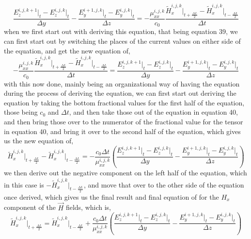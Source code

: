 \documentclass[]{article}
\begin{document}
\begin{equation}
\frac{E_{z}^{i, j, k+1} \Big|_t - E_{z}^{i,j,k}\Big|_t}{\Delta{y}} - \frac{E_{y}^{i+1, j, k} \Big|_t - E_{y}^{i,j,k}\Big|_t}{\Delta{z}} = -\frac{\mu_{xx}^{i,j,k}}{c_0} \frac{\tilde{H}_{x}^{i,j,k}\Big|_{t+\frac{\Delta{L}}{2}} - \tilde{H}_{x}^{i,j,k}\Big|_{t - \frac{\Delta{L}}{2}}}{\Delta{t}}
\end{equation}
when we first start out with deriving this equation, that being equation 39, we can first start out by switching the places of the current values on either side of the equation, and get the new equation of,
\\
\begin{equation}
-\frac{\mu_{xx}^{i,j,k}}{c_0} \frac{\tilde{H}_{x}^{i,j,k}\Big|_{t+\frac{\Delta{L}}{2}} - \tilde{H}_{x}^{i,j,k}\Big|_{t - \frac{\Delta{L}}{2}}}{\Delta{t}} = \frac{E_{z}^{i, j, k+1} \Big|_t - E_{z}^{i,j,k}\Big|_t}{\Delta{y}} - \frac{E_{y}^{i+1, j, k} \Big|_t - E_{y}^{i,j,k}\Big|_t}{\Delta{z}}
\end{equation}
with this now done, mainly being an organizational way of having the equation during the process of deriving the equation, we can first start out deriving the equation by taking the bottom fractional values for the first half of the equation, those being $c_0$ and $\Delta{t}$, and then take those out of the equation in equation 40, and then bring those over to the numerator of the fractional value for the tensor in equation 40, and bring it over to the second half of the equation, which gives us the new equation of,
\begin{equation}
\tilde{H}_{x}^{i,j,k}\Big|_{t+\frac{\Delta{L}}{2}} - \tilde{H}_{x}^{i,j,k}\Big|_{t - \frac{\Delta{L}}{2}} = -\frac{c_0\Delta{t}}{\mu_{xx}^{i,j,k}} \left(\frac{E_{z}^{i, j, k+1} \Big|_t - E_{z}^{i,j,k}\Big|_t}{\Delta{y}} - \frac{E_{y}^{i+1, j, k} \Big|_t - E_{y}^{i,j,k}\Big|_t}{\Delta{z}}\right)
\end{equation}
we then derive out the negative component on the left half of the equation, which in this case is $-\tilde{H}_{x}^{i,j,k}\Big|_{t - \frac{\Delta{L}}{2}}$, and move that over to the other side of the equation once derived, which gives us the final result and final equation of for the $H_x$ component of the $\vec{H}$ fields, which is,
\begin{equation}
\tilde{H}_{x}^{i,j,k}\Big|_{t+\frac{\Delta{L}}{2}} = \tilde{H}_{x}^{i,j,k}\Big|_{t - \frac{\Delta{L}}{2}} + \frac{c_0\Delta{t}}{\mu_{xx}^{i,j,k}} \left(\frac{E_{z}^{i, j, k+1} \Big|_t - E_{z}^{i,j,k}\Big|_t}{\Delta{y}} - \frac{E_{y}^{i+1, j, k} \Big|_t - E_{y}^{i,j,k}\Big|_t}{\Delta{z}}\right)
\end{equation}
\end{document}
